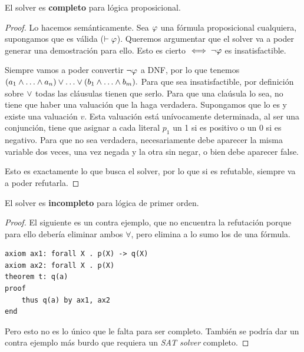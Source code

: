 \begin{theorem}
    El solver es \textbf{completo} para lógica proposicional.
\end{theorem}
\begin{proof}
Lo hacemos semánticamente. Sea $\varphi$ una fórmula proposicional cualquiera, supongamos que es válida ($\vdash \varphi$). Queremos argumentar que el solver va a poder generar una demostración para ello. Esto es cierto $\iff \neg \varphi$ es insatisfactible.

Siempre vamos a poder convertir $\neg \varphi$ a DNF, por lo que tenemos
\(
    (\formLit_1 \fAnd \dots \fAnd \formLit_n)
    \fOr \dots \fOr
    (\formLitTwo_1 \fAnd \dots \fAnd \formLitTwo_m).
\)
Para que sea insatisfactible, por definición sobre $\vee$ todas las cláusulas
tienen que serlo. Para que una claúsula lo sea, no tiene que haber una valuación
que la haga verdadera. Supongamos que lo es y existe una valuación $v$. Esta
valuación está unívocamente determinada, al ser una conjunción, tiene que
asignar a cada literal $p_1$ un 1 si es positivo o un 0 si es negativo. Para que
no sea verdadera, necesariamente debe aparecer la misma variable dos veces, una
vez negada y la otra sin negar, o bien debe aparecer false.

Esto es exactamente lo que busca el solver, por lo que si es refutable, siempre va a poder refutarla.

\end{proof}

\begin{theorem}
    El solver es \textbf{incompleto} para lógica de primer orden.
\end{theorem}
\begin{proof}
El siguiente es un contra ejemplo, que no encuentra la refutación porque para
ello debería eliminar ambos $\forall$, pero elimina a lo sumo los de una
fórmula.
\begin{lstlisting}
axiom ax1: forall X . p(X) -> q(X)
axiom ax2: forall X . p(X)
theorem t: q(a)
proof
    thus q(a) by ax1, ax2
end
\end{lstlisting}

Pero esto no es lo único que le falta para ser completo. También se podría dar un contra ejemplo más burdo que requiera un \textit{SAT solver} completo.
\end{proof}

